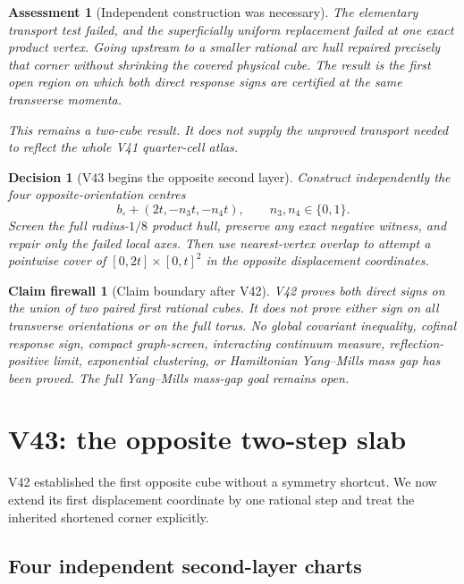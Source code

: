 \documentclass[11pt,oneside]{article}
\newtheorem{assessment}[theorem]{Assessment}
\newtheorem{firewall}[theorem]{Claim firewall}
\newtheorem{decision}[theorem]{Decision}
\theoremstyle{definition}
\theoremstyle{remark}
\begin{document}
\begin{assessment}[Independent construction was necessary]
\label{ass:newv42}
The elementary transport test failed, and the superficially
uniform replacement failed at one exact product vertex.  Going
upstream to a smaller rational arc hull repaired precisely that
corner without shrinking the covered physical cube.  The result is
the first open region on which both direct response signs are
certified at the same transverse momenta.

This remains a two-cube result.  It does not supply the unproved
transport needed to reflect the whole V41 quarter-cell atlas.
\end{assessment}

\begin{decision}[V43 begins the opposite second layer]
\label{dec:newv42-next}
Construct independently the four opposite-orientation centres
\[
 b_\circ+(2t,-n_3t,-n_4t),\qquad n_3,n_4\in\{0,1\}.    \tag{42.16}
\]
Screen the full radius-\(1/8\) product hull, preserve any exact
negative witness, and repair only the failed local axes.  Then use
nearest-vertex overlap to attempt a pointwise cover of
\([0,2t]\times[0,t]^2\) in the opposite displacement coordinates.
\end{decision}

\begin{firewall}[Claim boundary after V42]
\label{fire:newv42-final}
V42 proves both direct signs on the union of two paired first
rational cubes.  It does not prove either sign on all transverse
orientations or on the full torus.  No global covariant inequality,
cofinal response sign, compact graph-screen, interacting continuum
measure, reflection-positive limit, exponential clustering, or
Hamiltonian Yang--Mills mass gap has been proved.  The full
Yang--Mills mass-gap goal remains open.
\end{firewall}

\section{V43: the opposite two-step slab}
\label{sec:newv43-opposite-second-layer}

V42 established the first opposite cube without a symmetry
shortcut.  We now extend its first displacement coordinate by one
rational step and treat the inherited shortened corner explicitly.

\subsection{Four independent second-layer charts}
\end{document}
